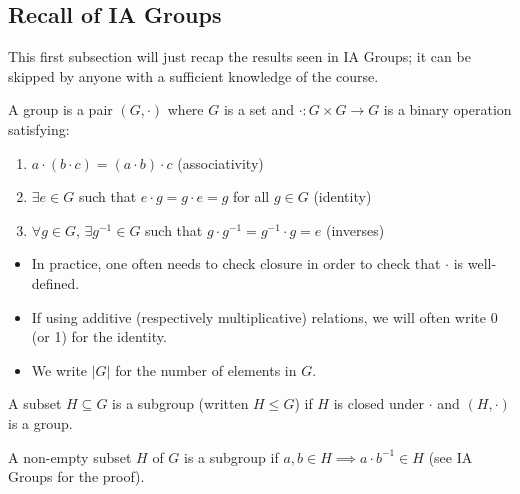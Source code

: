 \documentclass[a4paper]{scrartcl}
\begin{document}
\subsection{Recall of IA Groups}
This first subsection will just recap the results seen in IA Groups; it can be skipped by anyone with a sufficient knowledge of the course.
\begin{definition*}[Group]
     A group is a pair $(G, \cdot)$ where $G$ is a set and $\cdot: G \times G \rightarrow  G$ is a binary operation satisfying:
     \begin{enumerate}
         \item $a \cdot (b \cdot c)=(a \cdot b)\cdot c$ (associativity)
         \item $\exists e \in G$ such that $e \cdot g= g \cdot e =g$ for all $g \in G$ (identity)
         \item $\forall g \in G$, $\exists {g}^{-1} \in G$ such that $g \cdot {g}^{-1}={g}^{-1}\cdot g=e$ (inverses)
     \end{enumerate}
\end{definition*}
\begin{remarks}\hfill
     \begin{itemize}
         \item In practice, one often needs to check closure in order to check that $\cdot $ is well-defined.
         \item If using additive (respectively multiplicative) relations, we will often write 0 (or 1) for the identity.
         \item We write $|G|$ for the number of elements in $G$.
     \end{itemize}
\end{remarks}
\begin{definition*}[Subgroup]
     A subset $H \subseteq G$ is a subgroup (written $H \leq G$) if $H$ is closed under $\cdot$ and $(H, \cdot)$ is a group.
\end{definition*}
\begin{remark}
     A non-empty subset $H$ of $G$ is a subgroup if $a,b \in H \implies a \cdot {b}^{-1} \in H$ (see IA Groups for the proof). 
\end{remark}
\end{document}
